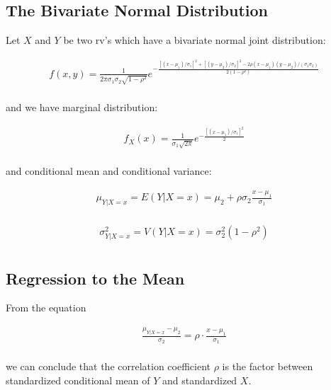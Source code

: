 \subsection{The Bivariate Normal Distribution}

\begin{definition}
    Let $X$ and $Y$ be two rv's which have a bivariate normal joint distribution: 

    \begin{align*}
        f(x,y) = \frac{1}{2\pi\sigma_1\sigma_2\sqrt{1-\rho^2}}e^{-\frac{[(x-\mu_1)/\sigma_1]^2 + [(y-\mu_2)/\sigma_2]^2 - 2\rho(x-\mu_1)(y-\mu_2)/(\sigma_1\sigma_2)}{2(1-\rho^2)}} \\
    \end{align*}

    and we have marginal distribution: 

    \begin{align*}
        f_X(x) = \frac{1}{\sigma_1\sqrt{2\pi}}e^{-\frac{[(x-\mu_1)/\sigma_1]^2}{2}} \\
    \end{align*}

    and conditional mean and conditional variance: 

    \begin{align*}
        \mu_{Y|X=x} = E(Y|X=x) = \mu_2 + \rho\sigma_2\frac{x-\mu_1}{\sigma_1} \\
    \end{align*}

    \begin{align*}
        \sigma_{Y|X=x}^2 = V(Y|X=x) = \sigma_2^2(1-\rho^2) \\
    \end{align*}
\end{definition}

\subsection{Regression to the Mean}

From the equation 

\begin{align*}
    \frac{\mu_{Y|X=x} - \mu_2}{\sigma_2} = \rho\cdot\frac{x-\mu_1}{\sigma_1} \\
\end{align*}

we can conclude that the correlation coefficient $\rho$ is the factor between standardized conditional mean of $Y$ and standardized $X$. 

